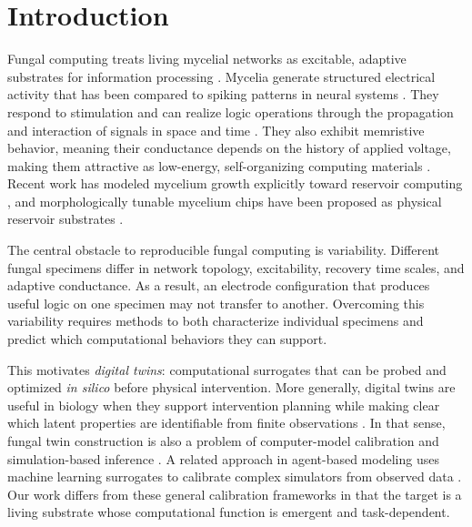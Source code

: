 \documentclass[letterpaper]{article}
\begin{document}
\section{Introduction}
Fungal computing treats living mycelial networks as excitable, adaptive substrates for information processing \citep{adamatzky2018towards, adamatzky2021adaptive, adamatzky2022fungal, adamatzky2023fungal}. Mycelia generate structured electrical activity that has been compared to spiking patterns in neural systems \citep{adamatzky2022language}. They respond to stimulation and can realize logic operations through the propagation and interaction of signals in space and time \citep{adamatzky2020boolean, roberts2022mining}. They also exhibit memristive behavior, meaning their conductance depends on the history of applied voltage, making them attractive as low-energy, self-organizing computing materials \citep{beasley2022mem, larocco2025sustainable, chua1971memristor, strukov2008missing}. Recent work has modeled mycelium growth explicitly toward reservoir computing \citep{jaeger2004harnessing, maass2002real, tompris2025mycelium}, and morphologically tunable mycelium chips have been proposed as physical reservoir substrates \citep{telhan2025morphologically}.

The central obstacle to reproducible fungal computing is variability. Different fungal specimens differ in network topology, excitability, recovery time scales, and adaptive conductance. As a result, an electrode configuration that produces useful logic on one specimen may not transfer to another. Overcoming this variability requires methods to both characterize individual specimens and predict which computational behaviors they can support.

This motivates \emph{digital twins}: computational surrogates that can be probed and optimized \textit{in silico} before physical intervention. More generally, digital twins are useful in biology when they support intervention planning while making clear which latent properties are identifiable from finite observations \citep{wu2024generative, clancy2026credible}. In that sense, fungal twin construction is also a problem of computer-model calibration and simulation-based inference \citep{kennedy2001bayesian, cranmer2020frontier}. A related approach in agent-based modeling uses machine learning surrogates to calibrate complex simulators from observed data \citep{lamperti2018agent}. Our work differs from these general calibration frameworks in that the target is a living substrate whose computational function is emergent and task-dependent.
\end{document}
